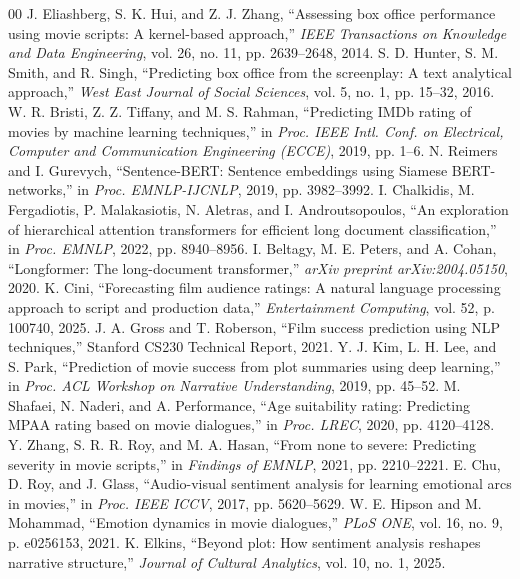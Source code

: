 \documentclass[conference]{IEEEtran}
\begin{document}
\begin{thebibliography}{00}
 J. Eliashberg, S. K. Hui, and Z. J. Zhang, ``Assessing box office performance using movie scripts: A kernel-based approach,'' \textit{IEEE Transactions on Knowledge and Data Engineering}, vol. 26, no. 11, pp. 2639--2648, 2014.
 S. D. Hunter, S. M. Smith, and R. Singh, ``Predicting box office from the screenplay: A text analytical approach,'' \textit{West East Journal of Social Sciences}, vol. 5, no. 1, pp. 15--32, 2016.
 W. R. Bristi, Z. Z. Tiffany, and M. S. Rahman, ``Predicting IMDb rating of movies by machine learning techniques,'' in \textit{Proc. IEEE Intl. Conf. on Electrical, Computer and Communication Engineering (ECCE)}, 2019, pp. 1--6.
 N. Reimers and I. Gurevych, ``Sentence-BERT: Sentence embeddings using Siamese BERT-networks,'' in \textit{Proc. EMNLP-IJCNLP}, 2019, pp. 3982--3992.
 I. Chalkidis, M. Fergadiotis, P. Malakasiotis, N. Aletras, and I. Androutsopoulos, ``An exploration of hierarchical attention transformers for efficient long document classification,'' in \textit{Proc. EMNLP}, 2022, pp. 8940--8956.
 I. Beltagy, M. E. Peters, and A. Cohan, ``Longformer: The long-document transformer,'' \textit{arXiv preprint arXiv:2004.05150}, 2020.
 K. Cini, ``Forecasting film audience ratings: A natural language processing approach to script and production data,'' \textit{Entertainment Computing}, vol. 52, p. 100740, 2025.
 J. A. Gross and T. Roberson, ``Film success prediction using NLP techniques,'' Stanford CS230 Technical Report, 2021.
 Y. J. Kim, L. H. Lee, and S. Park, ``Prediction of movie success from plot summaries using deep learning,'' in \textit{Proc. ACL Workshop on Narrative Understanding}, 2019, pp. 45--52.
 M. Shafaei, N. Naderi, and A. Performance, ``Age suitability rating: Predicting MPAA rating based on movie dialogues,'' in \textit{Proc. LREC}, 2020, pp. 4120--4128.
 Y. Zhang, S. R. R. Roy, and M. A. Hasan, ``From none to severe: Predicting severity in movie scripts,'' in \textit{Findings of EMNLP}, 2021, pp. 2210--2221.
 E. Chu, D. Roy, and J. Glass, ``Audio-visual sentiment analysis for learning emotional arcs in movies,'' in \textit{Proc. IEEE ICCV}, 2017, pp. 5620--5629.
 W. E. Hipson and M. Mohammad, ``Emotion dynamics in movie dialogues,'' \textit{PLoS ONE}, vol. 16, no. 9, p. e0256153, 2021.
 K. Elkins, ``Beyond plot: How sentiment analysis reshapes narrative structure,'' \textit{Journal of Cultural Analytics}, vol. 10, no. 1, 2025.

\end{thebibliography}
\end{document}
